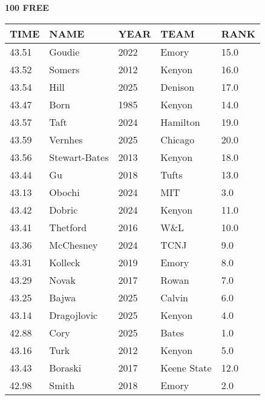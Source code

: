 \begin{minipage}[t]{0.48\textwidth}
\centering
\textbf{100 FREE}\\[0.05cm]
\begin{tabular}{@{}p{1.8cm}p{2.8cm}p{1.2cm}p{1.4cm}p{0.8cm}@{}}
\hline
\textbf{TIME} & \textbf{NAME} & \textbf{YEAR} & \textbf{TEAM} & \textbf{RANK} \\
\hline
43.51 & Goudie & 2022 & Emory & 15.0 \\
43.52 & Somers & 2012 & Kenyon & 16.0 \\
43.54 & Hill & 2025 & Denison & 17.0 \\
43.47 & Born & 1985 & Kenyon & 14.0 \\
43.57 & Taft & 2024 & Hamilton & 19.0 \\
43.59 & Vernhes & 2025 & Chicago & 20.0 \\
43.56 & Stewart-Bates & 2013 & Kenyon & 18.0 \\
43.44 & Gu & 2018 & Tufts & 13.0 \\
43.13 & Obochi & 2024 & MIT & 3.0 \\
43.42 & Dobric & 2024 & Kenyon & 11.0 \\
43.41 & Thetford & 2016 & W\&L & 10.0 \\
43.36 & McChesney & 2024 & TCNJ & 9.0 \\
43.31 & Kolleck & 2019 & Emory & 8.0 \\
43.29 & Novak & 2017 & Rowan & 7.0 \\
43.25 & Bajwa & 2025 & Calvin & 6.0 \\
43.14 & Dragojlovic & 2025 & Kenyon & 4.0 \\
42.88 & Cory & 2025 & Bates & 1.0 \\
43.16 & Turk & 2012 & Kenyon & 5.0 \\
43.43 & Boraski & 2017 & Keene State & 12.0 \\
42.98 & Smith & 2018 & Emory & 2.0 \\
\hline
\end{tabular}
\end{minipage}

\vspace{0.4cm}


